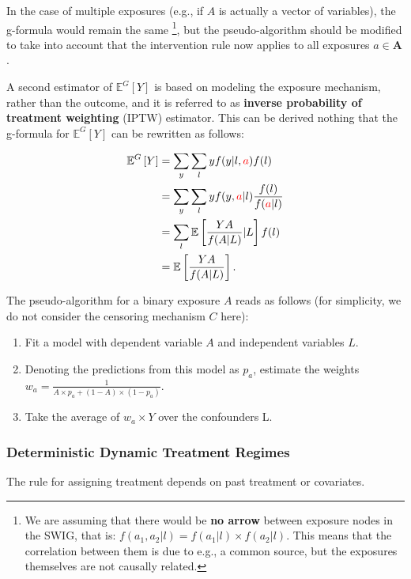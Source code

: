 \documentclass[12pt,twoside]{article}
\begin{document}
In the case of multiple exposures (e.g., if $A$ is actually a vector of variables), the g-formula would remain the same \footnote{We are assuming that there would be \textbf{no arrow} between exposure nodes in the SWIG, that is: $f(a_1,a_2|l) = f(a_1|l) \times f(a_2|l)$. This means that the correlation between them is due to e.g., a common source, but the exposures themselves are not causally related.}, but the pseudo-algorithm should be modified to take into account that the intervention rule now applies to all exposures $a \in \mathbf{A}$.

A second estimator of $\mathbb{E}^G [Y]$ is based on modeling the exposure mechanism, rather than the outcome, and it is referred to as \textbf{inverse probability of treatment weighting} (\Gls{IPTW}) estimator. This can be derived nothing that the g-formula for $\mathbb{E}^G [Y]$ can be rewritten as follows:

\begin{align}
    \mathbb{E}^G \left[ Y \right] &= \sum_y \sum_l y f(y|l,\textcolor{red}{a}) f(l) \\
    &= \sum_y \sum_l y f(y,\textcolor{red}{a}|l) \frac{f(l)}{f(\textcolor{red}{a}|l)} \\
    &= \sum_l \mathbb{E} \left[ \frac{YA}{f(A|L)} | L \right] f(l) \\
    &= \mathbb{E} \left[ \frac{YA}{f(A|L)} \right].
\end{align}

The pseudo-algorithm for a binary exposure $A$ reads as follows (for simplicity, we do not consider the censoring mechanism $C$ here):

\begin{enumerate}
    \item Fit a model with dependent variable $A$ and independent variables $L$.
    \item Denoting the predictions from this model as $p_a$, estimate the weights $w_a = \frac{1}{A \times p_a + (1-A) \times (1 - p_a)}$.
    \item Take the average of $w_a \times Y$ over the confounders L.
\end{enumerate}

\subsubsection{Deterministic Dynamic Treatment Regimes}
The rule for assigning treatment depends on past treatment or covariates.
\end{document}
